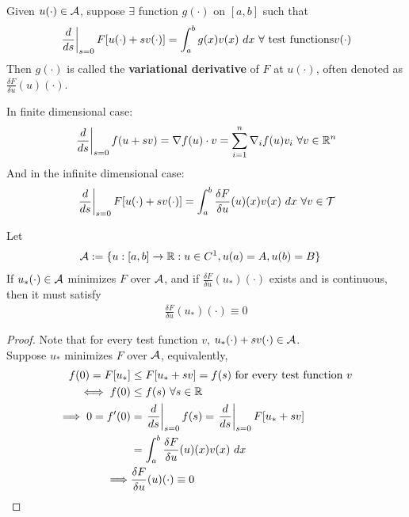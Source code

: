 \documentclass{article}
\begin{document}
	\begin{definition}
		Given $u(\cdot) \in \mathcal{{A}}$, suppose $\exists$ function $g(\cdot)$ on $[a, b]$ such that 
		\begin{align}
			\left. \frac{d}{ds} \right |_{s=0} F[u(\cdot) + sv(\cdot)] = \int_a^b g(x) v(x)\ dx\ \forall \text{{ test functions}} v(\cdot)
		\end{align}
		Then $g(\cdot)$ is called the \textbf{variational derivative} of $F$ at $u(\cdot)$, often denoted as $\frac{\delta F}{\delta u}(u)(\cdot)$.
	\end{definition}
	
	\begin{remark}
		In finite dimensional case:
		\begin{align}
			\left. \frac{d}{ds} \right |_{s=0} f(u + sv) = \nabla f(u) \cdot v = \sum_{i=1}^n \nabla_i f(u) v_i\ \forall v \in \mathbb{R}^n
		\end{align}
		And in the infinite dimensional case:
		\begin{align}
			\left. \frac{d}{ds} \right |_{s=0} F[u(\cdot) + s v(\cdot)] = \int_a^b \frac{\delta F}{\delta u}(u)(x) v(x)\ dx\ \forall v \in \mathcal{{T}}
		\end{align}
	\end{remark}
	
	\begin{lemma}
		Let 
		\begin{align}
			\mathcal{{A}} &:=\{u:[a, b] \to \mathbb{R}:u \in C^1, u(a) = A, u(b) = B\}
		\end{align}
		If $u_*(\cdot) \in \mathcal{{A}}$ minimizes $F$ over $\mathcal{{A}}$, and if $\frac{\delta F}{\delta u}(u_*)(\cdot)$ exists and is continuous, then it must satisfy
		\begin{align}
			\frac{\delta F}{\delta u}(u_*)(\cdot) \equiv 0
		\end{align}
	\end{lemma}
	
	\begin{proof}
		Note that for every test function $v$, $u_*(\cdot) + s v(\cdot) \in \mathcal{{A}}$. \\
		Suppose $u_*$ minimizes $F$ over $\mathcal{{A}}$, equivalently,
		\begin{align}
			f(0) = F[u_*] &\leq F[u_* + sv] = f(s) \text{{ for every test function $v$}} \\
			\iff f(0) &\leq f(s)\ \forall s \in \mathbb{R} \\
			\implies 0 = f'(0) 
			&= \left. \frac{d}{ds} \right |_{s=0} f(s)
			= \left. \frac{d}{ds} \right |_{s=0} F[u_* + sv] \\
			&= \int_a^b \frac{\delta F}{\delta u}(u)(x)v(x)\ dx \\
			\implies &\frac{\delta F}{\delta u}(u)(\cdot) \equiv 0
		\end{align}
	\end{proof}
	
\end{document}
